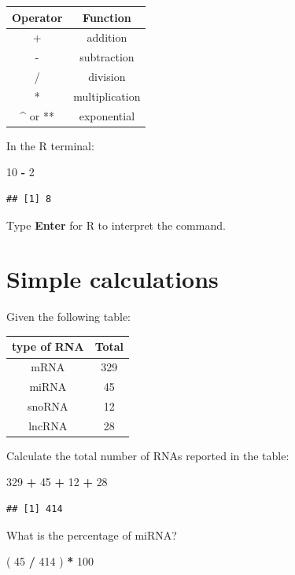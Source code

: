 \documentclass[]{book}
\newenvironment{Shaded}{\begin{snugshade}}{\end{snugshade}}
\newcommand{\DecValTok}[1]{\textcolor[rgb]{0.00,0.00,0.81}{#1}}
\newcommand{\NormalTok}[1]{#1}
\newcommand{\OperatorTok}[1]{\textcolor[rgb]{0.81,0.36,0.00}{\textbf{#1}}}
\newcommand{\StringTok}[1]{\textcolor[rgb]{0.31,0.60,0.02}{#1}}
\begin{document}
\begin{longtable}[]{@{}cc@{}}
\toprule
Operator & Function\tabularnewline
\midrule
\endhead
+ & addition\tabularnewline
- & subtraction\tabularnewline
/ & division\tabularnewline
* & multiplication\tabularnewline
\^{} or ** & exponential\tabularnewline
\bottomrule
\end{longtable}

In the R terminal:

\begin{Shaded}
\begin{Highlighting}[]
\DecValTok{10} \OperatorTok{-}\StringTok{ }\DecValTok{2}
\end{Highlighting}
\end{Shaded}

\begin{verbatim}
## [1] 8
\end{verbatim}

Type \textbf{Enter} for R to interpret the command.

\hypertarget{simple-calculations}{%
\section{Simple calculations}\label{simple-calculations}}

Given the following table:

\begin{longtable}[]{@{}cc@{}}
\toprule
type of RNA & Total\tabularnewline
\midrule
\endhead
mRNA & 329\tabularnewline
miRNA & 45\tabularnewline
snoRNA & 12\tabularnewline
lncRNA & 28\tabularnewline
\bottomrule
\end{longtable}

Calculate the total number of RNAs reported in the table:

\begin{Shaded}
\begin{Highlighting}[]
\DecValTok{329} \OperatorTok{+}\StringTok{ }\DecValTok{45} \OperatorTok{+}\StringTok{ }\DecValTok{12} \OperatorTok{+}\StringTok{ }\DecValTok{28}
\end{Highlighting}
\end{Shaded}

\begin{verbatim}
## [1] 414
\end{verbatim}

What is the percentage of miRNA?

\begin{Shaded}
\begin{Highlighting}[]
\NormalTok{( }\DecValTok{45} \OperatorTok{/}\StringTok{ }\DecValTok{414}\NormalTok{ ) }\OperatorTok{*}\StringTok{ }\DecValTok{100}
\end{Highlighting}
\end{Shaded}
\end{document}
